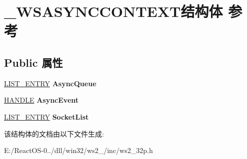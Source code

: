 \hypertarget{struct___w_s_a_s_y_n_c_c_o_n_t_e_x_t}{}\section{\+\_\+\+W\+S\+A\+S\+Y\+N\+C\+C\+O\+N\+T\+E\+X\+T结构体 参考}
\label{struct___w_s_a_s_y_n_c_c_o_n_t_e_x_t}
\subsection*{Public 属性}
\begin{DoxyCompactItemize}
\item 
\mbox{\label{struct___w_s_a_s_y_n_c_c_o_n_t_e_x_t_a4f918cd080d7b0a86d176104c53e717d}} 
\hyperlink{struct___l_i_s_t___e_n_t_r_y}{L\+I\+S\+T\+\_\+\+E\+N\+T\+RY} {\bfseries Async\+Queue}
\item 
\mbox{\label{struct___w_s_a_s_y_n_c_c_o_n_t_e_x_t_a79f88ccfc23220958d5cdea0ab4c3a13}} 
\hyperlink{interfacevoid}{H\+A\+N\+D\+LE} {\bfseries Async\+Event}
\item 
\mbox{\label{struct___w_s_a_s_y_n_c_c_o_n_t_e_x_t_ae2cf3dceb61f7640528e05318415bd83}} 
\hyperlink{struct___l_i_s_t___e_n_t_r_y}{L\+I\+S\+T\+\_\+\+E\+N\+T\+RY} {\bfseries Socket\+List}
\end{DoxyCompactItemize}


该结构体的文档由以下文件生成\+:\begin{DoxyCompactItemize}
\item 
E\+:/\+React\+O\+S-\/0../dll/win32/ws2\+\_/inc/ws2\+\_\+32p.\+h\end{DoxyCompactItemize}
